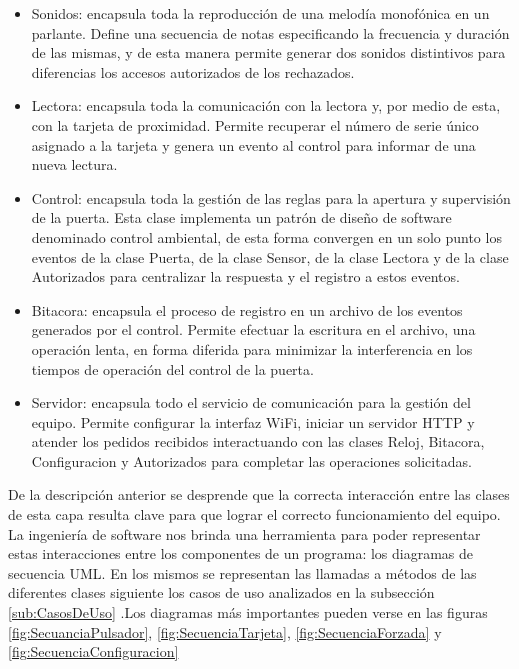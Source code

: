 \begin{itemize}
	\item Sonidos: encapsula toda la reproducción de una melodía monofónica en un parlante. Define una secuencia de notas especificando la frecuencia y duración de las mismas, y de esta manera permite generar dos sonidos distintivos para diferencias los accesos autorizados de los rechazados.
	
	\item Lectora: encapsula toda la comunicación con la lectora y, por medio de esta, con la tarjeta de proximidad. Permite recuperar el número de serie único asignado a la tarjeta y genera un evento al control para informar de una nueva lectura.

	\item Control: encapsula toda la gestión de las reglas para la apertura y supervisión de la puerta. Esta clase implementa un patrón de diseño de software denominado control ambiental, de esta forma convergen en un solo punto los eventos de la clase Puerta, de la clase Sensor, de la clase Lectora y de la clase Autorizados para centralizar la respuesta y el registro a estos eventos. 
	
	\item Bitacora: encapsula el proceso de registro en un archivo de los eventos generados por el control. Permite efectuar la escritura en el archivo, una operación lenta, en forma diferida para minimizar la interferencia en los tiempos de operación del control de la puerta.
	
	\item Servidor: encapsula todo el servicio de comunicación para la gestión del equipo. Permite configurar la interfaz WiFi, iniciar un servidor HTTP y atender los pedidos recibidos interactuando con las clases Reloj, Bitacora, Configuracion y Autorizados para completar las operaciones solicitadas.
	
\end{itemize}

De la descripción anterior se desprende que la correcta interacción entre las clases de esta capa resulta clave para que lograr el correcto funcionamiento del equipo. La ingeniería de software nos brinda una herramienta para poder representar estas interacciones entre los componentes de un programa: los diagramas de secuencia UML. En los mismos se representan las llamadas a métodos de las diferentes clases siguiente los casos de uso analizados en la subsección \ref{sub:CasosDeUso} .Los diagramas más importantes pueden verse en las figuras \ref{fig:SecuanciaPulsador}, \ref{fig:SecuenciaTarjeta}, \ref{fig:SecuenciaForzada} y \ref{fig:SecuenciaConfiguracion}

